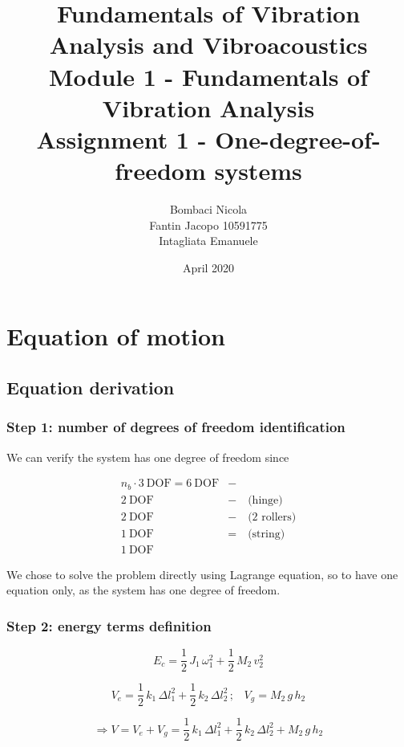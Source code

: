 \documentclass[a4paper,12pt,oneside]{article}
\title{Fundamentals of Vibration Analysis and Vibroacoustics \\
Module 1 - Fundamentals of Vibration Analysis \\
Assignment 1 - One-degree-of-freedom systems}
\author{Bombaci Nicola \\
Fantin Jacopo 10591775 \\
Intagliata Emanuele}
\date{April 2020}
\begin{document}
\maketitle

\section{Equation of motion}


\subsection{Equation derivation}


\subsubsection*{Step 1: number of degrees of freedom identification}

We can verify the system has one degree of freedom since

\[ \begin{split}
	n_b \cdot 3 ~ \text{DOF} = 6 ~ \text{DOF} & - \\
	2 ~ \text{DOF} & - \quad \text{(hinge)} \\
	2 ~ \text{DOF}  & - \quad \text{(2 rollers)} \\
	1 ~ \text{DOF} & = \quad \text{(string)} \\
	1 ~ \text{DOF}
\end{split} \]

We chose to solve the problem directly using Lagrange equation, so to have one equation only, as the system has one degree of freedom.

\subsubsection*{Step 2: energy terms definition}
\label{subs:energy_terms}

\[ E_c = \frac{1}{2} \, J_1 \, \omega_1^2 + \frac{1}{2} \, M_2 \, v_2^2 \]

\[
	V_e = \frac{1}{2} \, k_1 \, \Delta l_1^2 + %
		\frac{1}{2} \, k_2 \, \Delta l_2^2 \, \text{;} \quad V_g = M_2 \, g \, h_2
\]

\[
	\Rightarrow V = V_e + V_g = %
		\frac{1}{2} \, k_1 \, \Delta l_1^2 + \frac{1}{2} \, k_2 \, \Delta l_2^2 %
		+ M_2 \, g \, h_2
\]
\end{document}
